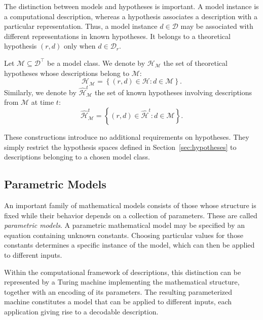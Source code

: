 The distinction between models and hypotheses is important. A model instance is a computational description, whereas a hypothesis associates a description with a particular representation. Thus, a model instance $d\in\mathcal{D}$ may be associated with different representations in known hypotheses. It belongs to a theoretical hypothesis $(r,d)$ only when $d\in\mathcal{D}_r$.

\begin{notation}
Let $\mathcal{M}\subseteq\mathcal{D}^\top$ be a model class. We denote by $\mathcal{H}_{\mathcal{M}}$ the set of theoretical hypotheses whose descriptions belong to $\mathcal{M}$:
\[
\mathcal{H}_{\mathcal{M}} = \left\{(r,d)\in\mathcal{H} : d\in\mathcal{M} \right\}.
\]
Similarly, we denote by $\hat{\mathcal{H}}_{\mathcal{M}}^t$ the set of known hypotheses involving descriptions from $\mathcal{M}$ at time $t$:
\[
\hat{\mathcal{H}}_{\mathcal{M}}^t = \left\{(r,d)\in\hat{\mathcal{H}}^t : d\in\mathcal{M} \right\}.
\]
\end{notation}

These constructions introduce no additional requirements on hypotheses. They simply restrict the hypothesis spaces defined in Section~\ref{sec:hypotheses} to descriptions belonging to a chosen model class.


\subsection*{Parametric Models}

An important family of mathematical models consists of those whose structure is fixed while their behavior depends on a collection of parameters. These are called \emph{parametric models}. A parametric mathematical model may be specified by an equation containing unknown constants. Choosing particular values for those constants determines a specific instance of the model, which can then be applied to different inputs.

Within the computational framework of descriptions, this distinction can be represented by a Turing machine implementing the mathematical structure, together with an encoding of its parameters. The resulting parameterized machine constitutes a model that can be applied to different inputs, each application giving rise to a decodable description.

